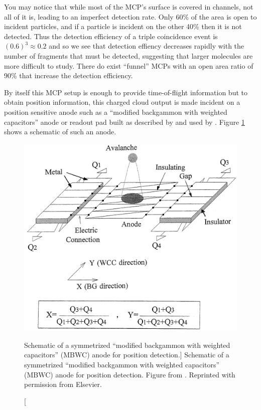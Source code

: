 You may notice that while most of the MCP's surface is covered in channels, not all of it is, leading to an imperfect detection rate. Only 60\% of the area is open to incident particles, and if a particle is incident on the other 40\% then it is not detected. Thus the detection efficiency of a triple coincidence event is $(0.6)^3 \approx 0.2$ and so we see that detection effiency decreases rapidly with the number of fragments that must be detected, suggesting that larger molecules are more difficult to study. There do exist ``funnel'' MCPs with an open area ratio of 90\% that increase the detection efficiency.

By itself this MCP setup is enough to provide time-of-flight information but to obtain position information, this charged cloud output is made incident on a position sensitive anode such as a ``modified backgammon with weighted capacitors'' anode or readout pad built as described by \citet{Veshapidze02} and used by \citet{Ramadhan16}. Figure \ref{fig:MBWC} shows a schematic of such an anode.

\begin{figure}
  \centering
  \includegraphics[width=\textwidth]{gfx/MBWC}
  \caption
  [Schematic of a symmetrized ``modified backgammon with weighted capacitors'' (MBWC) anode for position detection.]
  {Schematic of a symmetrized ``modified backgammon with weighted capacitors'' (MBWC) anode for position detection. Figure from \citet{Mizogawa02}. Reprinted with permission from Elsevier.}
  \label{fig:MBWC}
\end{figure}

